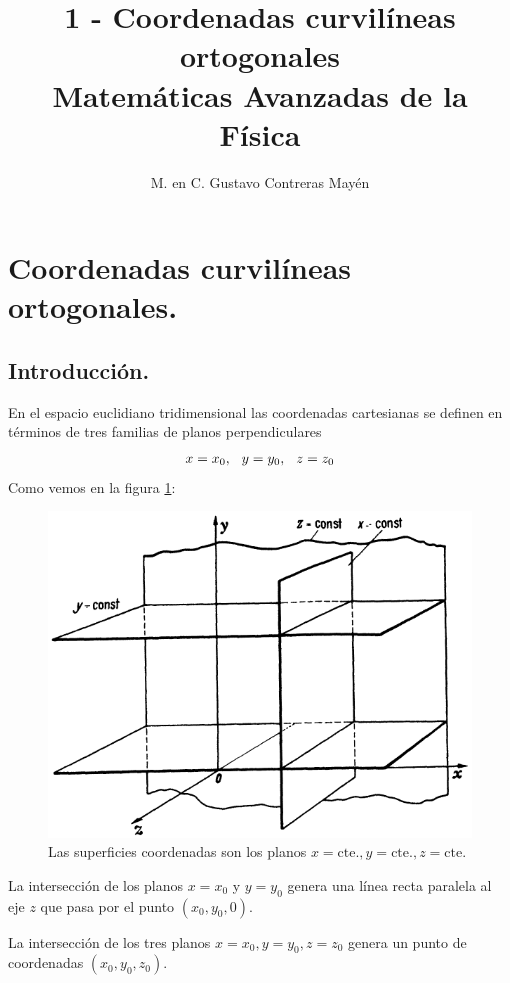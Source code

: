 
\usepackage{apacite}
\title{1 - Coordenadas curvilíneas ortogonales \\[0.3em]  \large{Matemáticas Avanzadas de la Física}\vspace{-3ex}}
\author{M. en C. Gustavo Contreras Mayén}
\date{ }

\vspace{-4cm}
\maketitle
\fontsize{14}{14}\selectfont
\tableofcontents
\newpage

\section{Coordenadas curvilíneas ortogonales.}
\subsection{Introducción.}

En el espacio euclidiano tridimensional las coordenadas cartesianas se definen en términos de tres familias de planos perpendiculares 
\begin{align*}
x = x_{0}, \hspace{0.25cm} y = y_{0}, \hspace{0.25cm} z = z_{0}
\end{align*}
Como vemos en la figura \ref{fig:figura_planos_cartesianos}:
\begin{figure}[H]
   \centering
   \includegraphics[scale=1.5]{Imagenes/Planos_Coordenadas_Cartesianas.png}
   \caption{Las superficies coordenadas son los planos $x=\mbox{cte.}, y=\mbox{cte.}, z=\mbox{cte.}$}
   \label{fig:figura_planos_cartesianos}
\end{figure}
La intersección de los planos $x = x_{0}$ y $y = y_{0}$ genera una línea recta paralela al eje $z$
que pasa por el punto $(x_{0}, y_{0}, 0)$.
\par
La intersección de los tres planos $x = x_{0}, y = y_{0}, z = z_{0}$ genera un punto de coordenadas $(x_{0}, y_{0}, z_{0})$.

